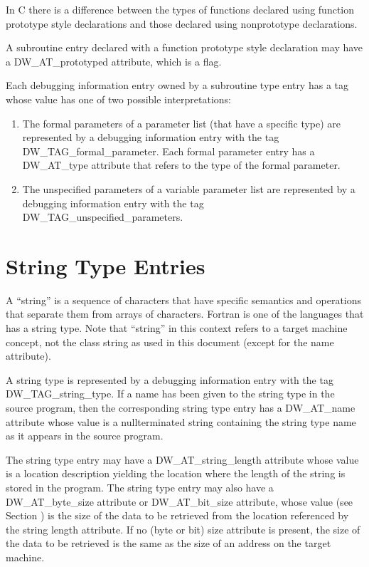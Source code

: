 In C there is a difference between the types of functions
declared using function prototype style declarations and
those declared using non\dash prototype declarations.

A subroutine entry declared with a function prototype style
declaration may have a DW\_AT\_prototyped attribute, which is
a flag.

Each debugging information entry owned by a subroutine
type entry has a tag whose value has one of two possible
interpretations:

\begin{enumerate}[1.]
\item The formal parameters of a parameter list (that have a
specific type) are represented by a debugging information entry
with the tag DW\_TAG\_formal\_parameter. Each formal parameter
entry has a DW\_AT\_type attribute that refers to the type of
the formal parameter.

\item The unspecified parameters of a variable parameter list
are represented by a debugging information entry with the
tag DW\_TAG\_unspecified\_parameters.
\end{enumerate}



\section{String Type Entries}
\label{chap:stringtypeentries}


A ``string'' is a sequence of characters that have specific
semantics and operations that separate them from arrays of
characters. Fortran is one of the languages that has a string
type. Note that ``string'' in this context refers to a target
machine concept, not the class string as used in this document
(except for the name attribute).

A string type is represented by a debugging information entry
with the tag DW\_TAG\_string\_type. If a name has been given to
the string type in the source program, then the corresponding
string type entry has a DW\_AT\_name attribute whose value is
a null\dash terminated string containing the string type name as
it appears in the source program.

The string type entry may have a DW\_AT\_string\_length attribute
whose value is a location description yielding the location
where the length of the string is stored in the program. The
string type entry may also have a DW\_AT\_byte\_size attribute
or DW\_AT\_bit\_size attribute, whose value 
(see Section ) 
is the size of the data to be retrieved from the location
referenced by the string length attribute. If no (byte or bit)
size attribute is present, the size of the data to be retrieved
is the same as the size of an address on the target machine.

